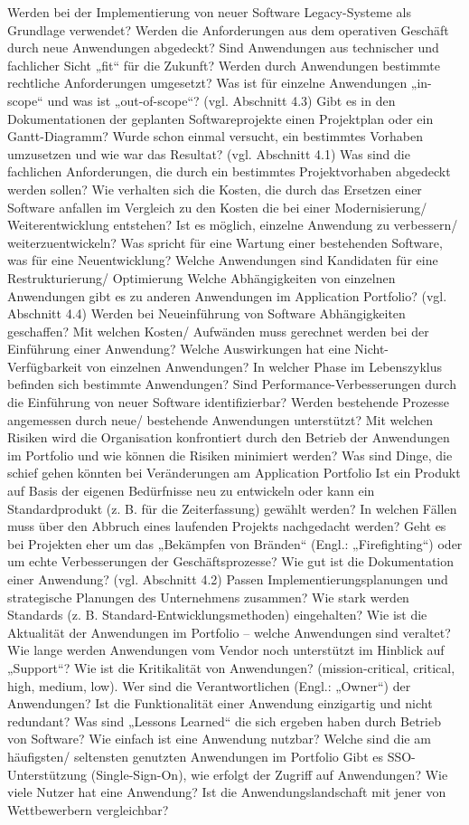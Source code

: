 Werden bei der Implementierung von neuer Software Legacy-Systeme als Grundlage verwendet?
Werden die Anforderungen aus dem operativen Geschäft durch neue Anwendungen abgedeckt?
Sind Anwendungen aus technischer und fachlicher Sicht „fit“ für die Zukunft?
Werden durch Anwendungen bestimmte rechtliche Anforderungen umgesetzt?
Was ist für einzelne Anwendungen „in-scope“ und was ist „out-of-scope“? (vgl. Abschnitt 4.3)
Gibt es in den Dokumentationen der geplanten Softwareprojekte einen Projektplan oder ein Gantt-Diagramm?
Wurde schon einmal versucht, ein bestimmtes Vorhaben umzusetzen und wie war das Resultat? (vgl. Abschnitt 4.1)
Was sind die fachlichen Anforderungen, die durch ein bestimmtes Projektvorhaben abgedeckt werden sollen?
Wie verhalten sich die Kosten, die durch das Ersetzen einer Software anfallen im Vergleich zu den Kosten die bei einer Modernisierung/ Weiterentwicklung entstehen?
Ist es möglich, einzelne Anwendung zu verbessern/ weiterzuentwickeln?
Was spricht für eine Wartung einer bestehenden Software, was für eine Neuentwicklung?
Welche Anwendungen sind Kandidaten für eine Restrukturierung/ Optimierung
Welche Abhängigkeiten von einzelnen Anwendungen gibt es zu anderen Anwendungen im Application Portfolio? (vgl. Abschnitt 4.4)
Werden bei Neueinführung von Software Abhängigkeiten geschaffen?
Mit welchen Kosten/ Aufwänden muss gerechnet werden bei der Einführung einer Anwendung?
Welche Auswirkungen hat eine Nicht-Verfügbarkeit von einzelnen Anwendungen?
In welcher Phase im Lebenszyklus befinden sich bestimmte Anwendungen?
Sind Performance-Verbesserungen durch die Einführung von neuer Software identifizierbar?
Werden bestehende Prozesse angemessen durch neue/ bestehende Anwendungen unterstützt?
Mit welchen Risiken wird die Organisation konfrontiert durch den Betrieb der Anwendungen im Portfolio und wie können die Risiken minimiert werden?
Was sind Dinge, die schief gehen könnten bei Veränderungen am Application Portfolio
Ist ein Produkt auf Basis der eigenen Bedürfnisse neu zu entwickeln oder kann ein Standardprodukt (z. B. für die Zeiterfassung) gewählt werden?
In welchen Fällen muss über den Abbruch eines laufenden Projekts nachgedacht werden?
Geht es bei Projekten eher um das „Bekämpfen von Bränden“ (Engl.: „Firefighting“) oder um echte Verbesserungen der Geschäftsprozesse?
Wie gut ist die Dokumentation einer Anwendung? (vgl. Abschnitt 4.2)
Passen Implementierungsplanungen und strategische Planungen des Unternehmens zusammen?
Wie stark werden Standards (z. B. Standard-Entwicklungsmethoden) eingehalten?
Wie ist die Aktualität der Anwendungen im Portfolio – welche Anwendungen sind veraltet?
Wie lange werden Anwendungen vom Vendor noch unterstützt im Hinblick auf „Support“?
Wie ist die Kritikalität von Anwendungen? (mission-critical, critical, high, medium, low).
Wer sind die Verantwortlichen (Engl.: „Owner“) der Anwendungen?
Ist die Funktionalität einer Anwendung einzigartig und nicht redundant?
Was sind „Lessons Learned“ die sich ergeben haben durch Betrieb von Software?
Wie einfach ist eine Anwendung nutzbar?
Welche sind die am häufigsten/ seltensten genutzten Anwendungen im Portfolio
Gibt es SSO-Unterstützung (Single-Sign-On), wie erfolgt der Zugriff auf Anwendungen?
Wie viele Nutzer hat eine Anwendung?
Ist die Anwendungslandschaft mit jener von Wettbewerbern vergleichbar?

